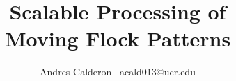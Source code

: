\documentclass{beamer}
\title{Scalable Processing of \\Moving Flock Patterns}
\subtitle{}
\author{
    Andres Calderon \textperiodcentered \ acald013@ucr.edu \\
}
\institute{University of California, Riverside}
\begin{document}
    \begin{frame}
        \maketitle
    \end{frame}

%


\end{document}
